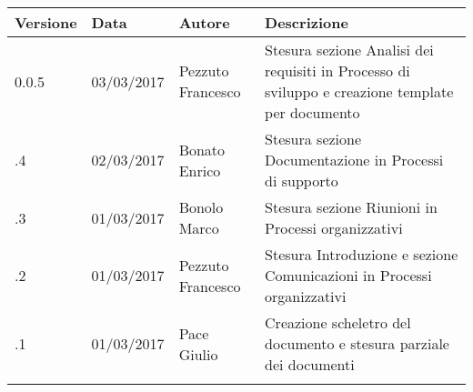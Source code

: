 	\newpage
		\begin{longtabu} to \textwidth {
				X[4,l,p]
				X[4,l,p]
				X[4,l,p]
				X[8,l,p]}
			\toprule
			 Versione & Data & Autore & Descrizione \\
			\midrule
			\endhead

		0.0.5 & 03/03/2017 & Pezzuto Francesco & Stesura sezione Analisi dei requisiti in Processo di sviluppo e creazione template per documento\\
		\addlinespace[0.2em]
		\midrule
		.4 & 02/03/2017 & Bonato Enrico & Stesura sezione Documentazione in Processi di supporto\\
		\addlinespace[0.2em]
		\midrule
		.3 & 01/03/2017 & Bonolo Marco & Stesura sezione Riunioni in Processi organizzativi\\
		\addlinespace[0.2em]
		\midrule
		.2 & 01/03/2017 & Pezzuto Francesco & Stesura Introduzione e sezione Comunicazioni in Processi organizzativi\\
		\addlinespace[0.2em]
		\midrule
		.1 & 01/03/2017 & Pace Giulio & Creazione scheletro del documento e stesura parziale dei documenti\\
		\addlinespace[0.4em]
		\bottomrule
	\end{longtabu}
